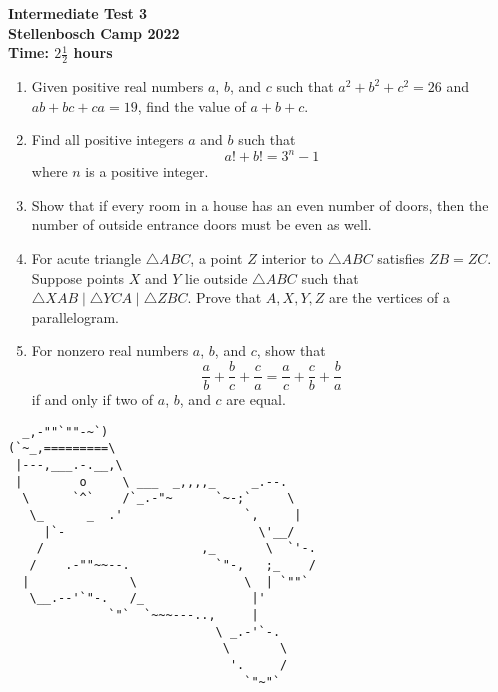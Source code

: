 \documentclass{article}
\begin{document}
\thispagestyle{empty}

\begin{center}
  \textbf{\Large Intermediate Test 3}
  \\ \vspace{1em}
  \textbf{\large Stellenbosch Camp 2022}
  \\ \vspace{1em}
  \textbf{\large Time: $2\frac{1}{2}$ hours}
\end{center}

\bigskip

\begin{enumerate}[itemsep=\fill]

\item %
Given positive real numbers $a$, $b$, and $c$ such that $a^2+b^2+c^2 = 26$ and $ab+bc+ca = 19$, find the value of $a+b+c$.


\item %
Find all positive integers $a$ and $b$ such that 
$$a! + b! = 3^n -1 $$
where $n$ is a positive integer.


\item %
Show that if every room in a house has an even number of doors, then the number of outside entrance doors must be even as well.


\item %
For acute triangle $\triangle ABC$, a point $Z$ interior to $\triangle ABC$ satisfies $ZB = ZC$.
Suppose points $X$ and $Y$ lie outside $\triangle ABC$ such that $\triangle XAB \mathop{|||} \triangle YCA \mathop{|||} \triangle ZBC$.
Prove that $A,X,Y,Z$ are the vertices of a parallelogram. 


\item %
For nonzero real numbers $a$, $b$, and $c$, show that
\[ \frac{a}{b} +\frac{b}{c} +\frac{c}{a} = \frac{a}{c} +\frac{c}{b} +\frac{b}{a} \]
if and only if two of $a$, $b$, and $c$ are equal.

\end{enumerate}


\vfill
\centering
\small
\begin{BVerbatim}
  _,-""`""-~`)
(`~_,=========\
 |---,___.-.__,\
 |        o     \ ___  _,,,,_     _.--.
  \      `^`    /`_.-"~      `~-;`     \
   \_      _  .'                 `,     |
     |`-                           \'__/ 
    /                      ,_       \  `'-. 
   /    .-""~~--.            `"-,   ;_    /
  |              \               \  | `""`
   \__.--'`"-.   /_               |'
              `"`  `~~~---..,     |
                             \ _.-'`-.
                              \       \
                               '.     /
                                 `"~"`
\end{BVerbatim}
\end{document}
